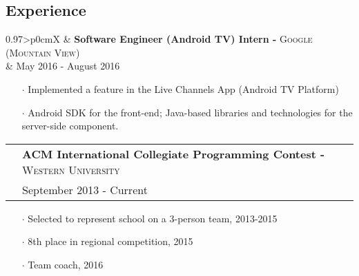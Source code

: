 \documentclass[letterpaper, oneside, final]{scrartcl} %
\newcommand{\gray}{\rowcolor[gray]{.90}} %
\begin{document}
\begin{center}
\vspace{-3mm}

\section{Experience}

\renewcommand{\arraystretch}{1.3}

\begin{tabularx}{0.97\linewidth}{>{\raggedleft\scshape}p{0cm}X}
\gray & \textbf{Software Engineer (Android TV) Intern -} \textsc{Google (Mountain View)}\\
\gray & {May 2016 - August 2016}\\
\end{tabularx}
\vspace{-0.1cm}
\begin{itemize} \itemsep-0.2cm
\item[$\cdot$] Implemented a feature in the Live Channels App (Android TV Platform)
\item[$\cdot$] Android SDK for the front-end; Java-based libraries and technologies for the server-side component.

\end{itemize}

\vspace{-0.05cm}

\begin{tabularx}{0.97\linewidth}{>{\raggedleft\scshape}p{0cm}X}
\gray & \textbf{ACM International Collegiate Programming Contest -} \textsc{Western University}\\
\gray & {September 2013 - Current}\	\
\end{tabularx}
\vspace{-0.1cm}
\begin{itemize} \itemsep-0.2cm
\item[$\cdot$] Selected to represent school on a 3-person team, 2013-2015\\ \item[$\cdot$] 8th place in regional competition, 2015 \\
\item[$\cdot$] Team coach, 2016 \\
\end{itemize}

\vspace{-0.05cm}


\end{center}
\end{document}
